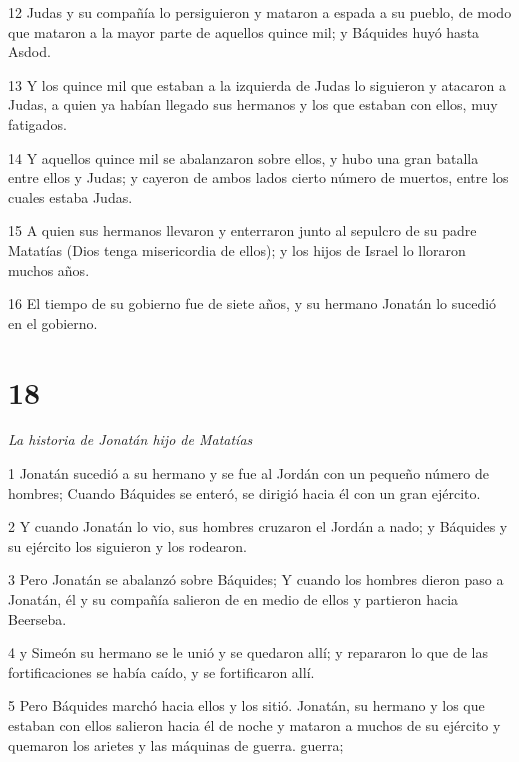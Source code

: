 \par 12 Judas y su compañía lo persiguieron y mataron a espada a su pueblo, de modo que mataron a la mayor parte de aquellos quince mil; y Báquides huyó hasta Asdod.

\par 13 Y los quince mil que estaban a la izquierda de Judas lo siguieron y atacaron a Judas, a quien ya habían llegado sus hermanos y los que estaban con ellos, muy fatigados.

\par 14 Y aquellos quince mil se abalanzaron sobre ellos, y hubo una gran batalla entre ellos y Judas; y cayeron de ambos lados cierto número de muertos, entre los cuales estaba Judas.

\par 15 A quien sus hermanos llevaron y enterraron junto al sepulcro de su padre Matatías (Dios tenga misericordia de ellos); y los hijos de Israel lo lloraron muchos años.

\par 16 El tiempo de su gobierno fue de siete años, y su hermano Jonatán lo sucedió en el gobierno.

\chapter{18}

\par \textit{La historia de Jonatán hijo de Matatías}

\par 1 Jonatán sucedió a su hermano y se fue al Jordán con un pequeño número de hombres; Cuando Báquides se enteró, se dirigió hacia él con un gran ejército.

\par 2 Y cuando Jonatán lo vio, sus hombres cruzaron el Jordán a nado; y Báquides y su ejército los siguieron y los rodearon.

\par 3 Pero Jonatán se abalanzó sobre Báquides; Y cuando los hombres dieron paso a Jonatán, él y su compañía salieron de en medio de ellos y partieron hacia Beerseba.

\par 4 y Simeón su hermano se le unió y se quedaron allí; y repararon lo que de las fortificaciones se había caído, y se fortificaron allí.

\par 5 Pero Báquides marchó hacia ellos y los sitió. Jonatán, su hermano y los que estaban con ellos salieron hacia él de noche y mataron a muchos de su ejército y quemaron los arietes y las máquinas de guerra. guerra;

